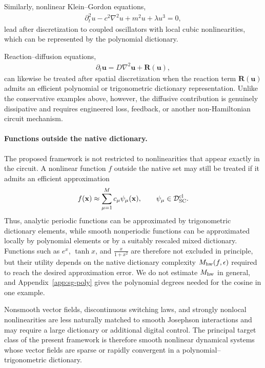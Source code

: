 \documentclass[pra,twocolumn,superscriptaddress,nofootinbib,floatfix]{revtex4-2}
\theoremstyle{remark}
\newcommand{\revcolor}{\color{blue}}
\DeclareRobustCommand{\rev}[1]{{\revcolor #1}}
\begin{document}
Similarly, nonlinear Klein--Gordon equations,
\begin{align}
\partial_t^2u-c^2\nabla^2u+m^2u+\lambda u^3=0,
\label{eq:nonlinear-klein-gordon}
\end{align}
lead after discretization to coupled oscillators with local cubic nonlinearities, which can be represented by the polynomial dictionary.

Reaction--diffusion equations,
\begin{align}
\partial_t \mathbf u=D\nabla^2\mathbf u+\mathbf R(\mathbf u),
\label{eq:reaction-diffusion}
\end{align}
can likewise be treated after spatial discretization when the reaction term \(\mathbf R(\mathbf u)\) admits an efficient polynomial or trigonometric dictionary representation. Unlike the conservative examples above, however, the diffusive contribution is genuinely dissipative and requires engineered loss, feedback, or another non-Hamiltonian circuit mechanism.

\paragraph{Functions outside the native dictionary.}
The proposed framework is not restricted to nonlinearities that appear exactly in the circuit. A nonlinear function \(f\) outside the native set may still be treated if it admits an efficient approximation
\begin{align}
f(\mathbf x)\approx\sum_{\mu=1}^{M}c_{\mu}\psi_{\mu}(\mathbf x),\qquad\psi_\mu\in\mathcal D_{\rm SC}^{\rm cl}.
\end{align}
Thus, analytic periodic functions can be approximated by trigonometric dictionary elements, while smooth nonperiodic functions can be approximated locally by polynomial elements or by a suitably rescaled mixed dictionary. \rev{Functions such as \(e^x\), \(\tanh x\), and \(\frac{x}{1+x^2}\) are therefore not excluded in principle, but their utility depends on the native dictionary complexity \(M_{\rm hw}(f,\epsilon)\) required to reach the desired approximation error.} \rev{We do not estimate \(M_{\rm hw}\) in general, and Appendix~\ref{app:sg-poly} gives the polynomial degrees needed for the cosine in one example.}

Nonsmooth vector fields, discontinuous switching laws, and strongly nonlocal nonlinearities are less naturally matched to smooth Josephson interactions and may require a large dictionary or additional digital control. The principal target class of the present framework is therefore smooth nonlinear dynamical systems whose vector fields are sparse or rapidly convergent in a polynomial--trigonometric dictionary.
\end{document}
